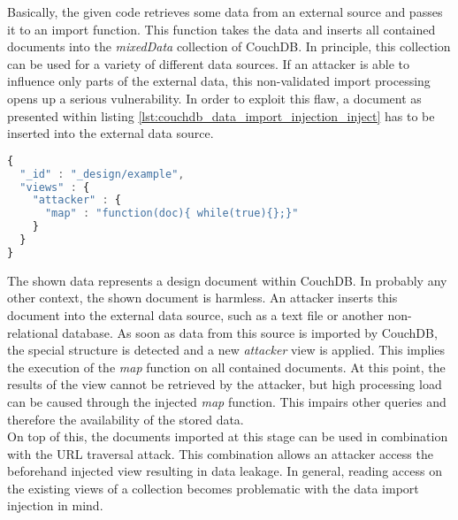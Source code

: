 Basically, the given code retrieves some data from an external source and passes it to an import function. This function takes the data and inserts all contained documents into the \emph{mixedData} collection of CouchDB. In principle, this collection can be used for a variety of different data sources. If an attacker is able to influence only parts of the external data, this non-validated import processing opens up a serious vulnerability. In order to exploit this flaw, a document as presented within listing \ref{lst:couchdb_data_import_injection_inject} has to be inserted into the external data source.

\begin{lstlisting}[caption={Critical document for data import injection against CouchDB}, label={lst:couchdb_data_import_injection_inject}, language=JavaScript]
{
  "_id" : "_design/example",
  "views" : {
    "attacker" : {
      "map" : "function(doc){ while(true){};}"
    }
  }
}
\end{lstlisting}

The shown data represents a design document within CouchDB. In probably any other context, the shown document is harmless. An attacker inserts this document into the external data source, such as a text file or another non-relational database. As soon as data from this source is imported by CouchDB, the special structure is detected and a new \emph{attacker} view is applied. This implies the execution of the \emph{map} function on all contained documents. At this point, the results of the view cannot be retrieved by the attacker, but high processing load can be caused through the injected \emph{map} function. This impairs other queries and therefore the availability of the stored data. \\

On top of this, the documents imported at this stage can be used in combination with the URL traversal attack. This combination allows an attacker access the beforehand injected view resulting in data leakage. In general, reading access on the existing views of a collection becomes problematic with the data import injection in mind. \\

